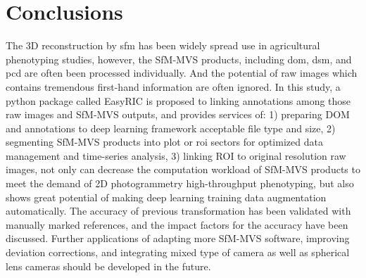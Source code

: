 \documentclass{configs/bmcart}
\begin{document}
\section*{Conclusions}
The 3D reconstruction by \acrshort*{sfm} has been widely spread use in agricultural phenotyping studies, however, the SfM-MVS products, including \acrshort*{dom}, \acrshort*{dsm}, and \acrshort*{pcd} are often been processed individually. And the potential of raw images which contains tremendous first-hand information are often ignored. In this study, a python package called EasyRIC is proposed to linking annotations among those raw images and SfM-MVS outputs, and provides services of: 1) preparing DOM and annotations to deep learning framework acceptable file type and size, 2) segmenting SfM-MVS products into plot or \acrshort*{roi} sectors for optimized data management and time-series analysis, 3) linking ROI to original resolution raw images, not only can decrease the computation workload of SfM-MVS products to meet the demand of 2D photogrammetry high-throughput phenotyping, but also shows great potential of making deep learning training data augmentation automatically. The accuracy of previous transformation has been validated with manually marked references, and the impact factors for the accuracy have been discussed. Further applications of adapting more SfM-MVS software, improving deviation corrections, and integrating mixed type of camera as well as spherical lens cameras should be developed in the future.


\end{document}
